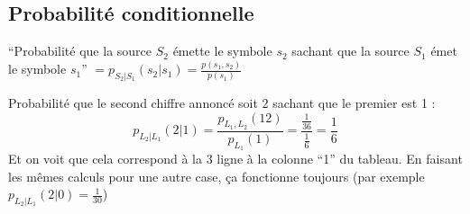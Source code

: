 \documentclass[11pt,a4paper]{article}
\renewcommand{\)}{\right)}
\renewcommand{\(}{\left(}
\begin{document}
\subsection{Probabilité conditionnelle}
\enquote{Probabilité que la source $S_2$ émette le symbole $s_2$ sachant que la source $S_1$ émet le symbole $s_1$} $ = p_{S_2|S_1}(s_2|s_1) = \frac{p(s_1,s_2)}{p(s_1)}$
\begin{exemple}
	Probabilité que le second chiffre annoncé soit 2 sachant que le premier est 1 : \[p_{L_2|L_1}(2|1) = \frac{p_{L_1,L_2}(12)}{p_{L_1}(1)} = \frac{\frac{1}{36}}{\frac{1}{6}} = \frac{1}{6}\]
	Et  on voit que cela correspond à la 3 ligne à la colonne \enquote{1} du tableau. En faisant les mêmes calculs pour une autre case, ça fonctionne toujours (par exemple $p_{L_2|L_1}(2|0) = \frac{1}{30}$)
\end{exemple}
\end{document}

